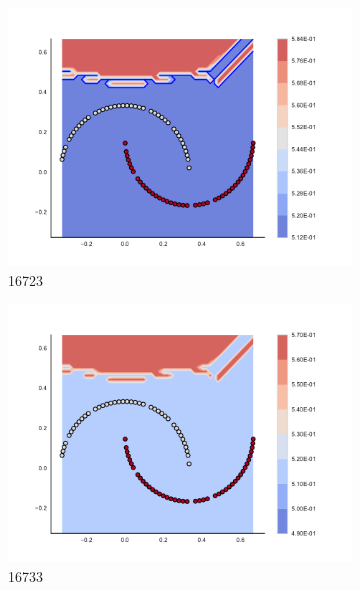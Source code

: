 \begin{figure}[h]
\begin{subfigure}[b]{0.09\textwidth}
    \includegraphics[clip, trim=2.35cm 1.75cm 4.5cm 0cm,width=\textwidth]{img/convergence/16723.pdf}
    \caption{16723}
    \label{fig:convergence_16723}
\end{subfigure}
%
\begin{subfigure}[b]{0.09\textwidth}
    \includegraphics[clip, trim=2.35cm 1.75cm 4.5cm 0cm,width=\textwidth]{img/convergence/16733.pdf}
    \caption{16733}
    \label{fig:convergence_16733}
\end{subfigure}
%
\begin{subfigure}[b]{0.09\textwidth}

\end{subfigure}
\end{figure}
